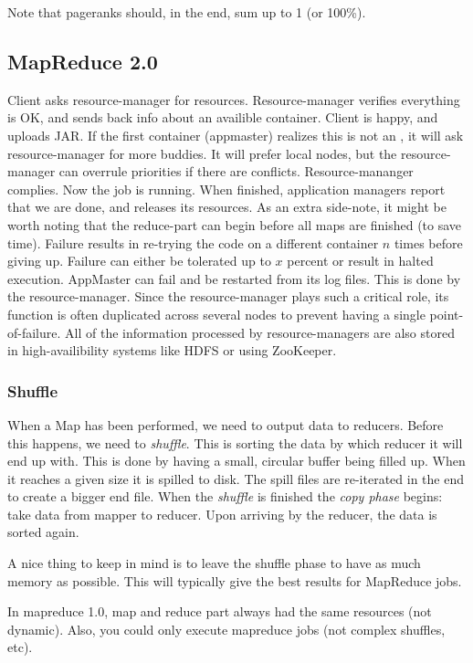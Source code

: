 Note that pageranks should, in the end, sum up to 1 (or 100\%). 


\subsection{MapReduce 2.0}
Client asks resource-manager for resources.
Resource-manager verifies everything is OK, and sends back info about an availible container. Client is happy, and uploads JAR.
If the first container (appmaster) realizes this is not an , it will ask resource-manager for more buddies. It will prefer local nodes, but the resource-manager can overrule priorities if there are conflicts. Resource-mananger complies.
Now the job is running. When finished, application managers report that we are done, 
and releases its resources. As an extra side-note, it might be worth noting that the
reduce-part can begin before all maps are finished (to save time).
Failure results in re-trying the code on a different container $n$ times before giving up. Failure can either be tolerated up to $x$ percent or result in halted execution.
AppMaster can fail and be restarted from its log files. This is done by the resource-manager. Since the resource-manager plays such a critical role, its function
is often duplicated across several nodes to prevent having a single point-of-failure.
All of the information processed by resource-managers are also stored in high-availibility systems like HDFS or using ZooKeeper.

\subsubsection{Shuffle}
When a Map has been performed, we need to output data to reducers. Before this happens,
we need to \textit{shuffle}. This is sorting the data by which reducer it will end up with. This is done by having a small, circular buffer being filled up. When it reaches
a given size it is spilled to disk. The spill files are re-iterated in the end to create
a bigger end file. When the \textit{shuffle} is finished the \textit{copy phase} begins: take data from mapper to reducer. Upon arriving by the reducer, the data is sorted again.

A nice thing to keep in mind is to leave the shuffle phase to have as much memory as possible. This will typically give the best results for MapReduce jobs.

In mapreduce 1.0, map and reduce part always had the same resources (not dynamic). Also, you could only execute mapreduce jobs (not complex shuffles, etc).

